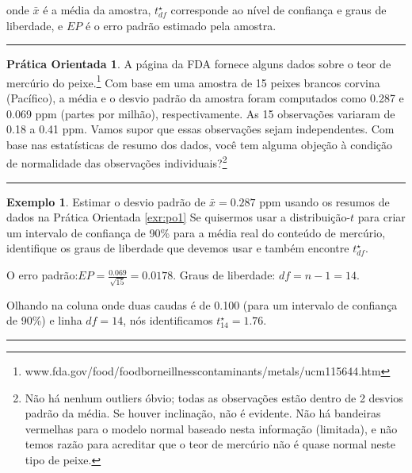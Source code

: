 \documentclass[
]{book}
\theoremstyle{definition}
\theoremstyle{definition}
\newtheorem{example}{Exemplo}[chapter]
\theoremstyle{definition}
\newtheorem{exercise}{Prática Orientada}[chapter]
\theoremstyle{definition}
\theoremstyle{remark}
\begin{document}
onde \(\bar{x}\) é a média da amostra, \(t^{\star}_{df}\) corresponde ao nível de confiança e graus de liberdade, e \(EP\) é o erro padrão estimado pela amostra.

\begin{center}\rule{0.5\linewidth}{0.5pt}\end{center}

\begin{exercise}
\protect\hypertarget{exr:po1}{}{\label{exr:po1} }A página da FDA fornece alguns dados sobre o teor de mercúrio do peixe.\footnote{www.fda.gov/food/foodborneillnesscontaminants/metals/ucm115644.htm} Com base em uma amostra de 15 peixes brancos corvina (Pacífico), a média e o desvio padrão da amostra foram computados como 0.287 e 0.069 ppm (partes por milhão), respectivamente. As 15 observações variaram de 0.18 a 0.41 ppm. Vamos supor que essas observações sejam independentes. Com base nas estatísticas de resumo dos dados, você tem alguma objeção à condição de normalidade das observações individuais?\footnote{Não há nenhum outliers óbvio; todas as observações estão dentro de 2 desvios padrão da média. Se houver inclinação, não é evidente. Não há bandeiras vermelhas para o modelo normal baseado nesta informação (limitada), e não temos razão para acreditar que o teor de mercúrio não é quase normal neste tipo de peixe.}
\end{exercise}

\begin{center}\rule{0.5\linewidth}{0.5pt}\end{center}

\begin{example}
\protect\hypertarget{exm:ex1}{}{\label{exm:ex1} }Estimar o desvio padrão de \(\bar{x}=0.287\) ppm usando os resumos de dados na Prática Orientada \ref{exr:po1} Se quisermos usar a distribuição-\(t\) para criar um intervalo de confiança de 90\% para a média real do conteúdo de mercúrio, identifique os graus de liberdade que devemos usar e também encontre \(t^{\star}_{df}\).
\end{example}

O erro padrão:\(EP = \frac{0.069}{\sqrt{15}} = 0.0178\). Graus de liberdade: \(df = n - 1 = 14\).

Olhando na coluna onde duas caudas é de 0.100 (para um intervalo de confiança de 90\%) e linha \(df=14\), nós identificamos \(t^{\star}_{14} = 1.76\).

\begin{center}\rule{0.5\linewidth}{0.5pt}\end{center}
\end{document}

